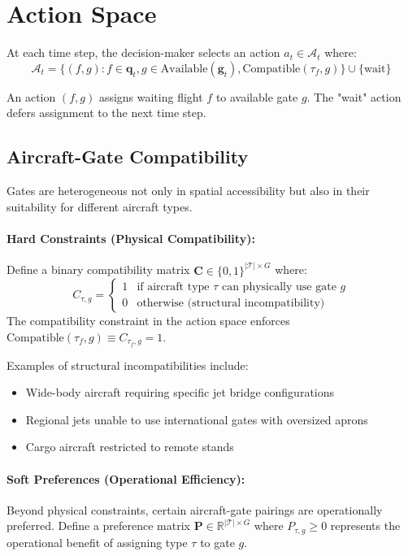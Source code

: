 \section{Action Space}

At each time step, the decision-maker selects an action $a_t \in \mathcal{A}_t$ where:
%
\begin{equation}
	\mathcal{A}_t = \{(f, g) : f \in \mathbf{q}_t, g \in \text{Available}(\mathbf{g}_t), 
	\text{Compatible}(\tau_f, g)\} \cup \{\text{wait}\}
\end{equation}

An action $(f, g)$ assigns waiting flight $f$ to available gate $g$. The "wait" action defers assignment to the next time step.
\subsection{Aircraft-Gate Compatibility}

Gates are heterogeneous not only in spatial accessibility but also in their 
suitability for different aircraft types.

\paragraph{Hard Constraints (Physical Compatibility):}
Define a binary compatibility matrix $\mathbf{C} \in \{0,1\}^{|\mathcal{T}| \times G}$ 
where:
%
\begin{equation}
	C_{\tau,g} = \begin{cases}
		1 & \text{if aircraft type } \tau \text{ can physically use gate } g \\
		0 & \text{otherwise (structural incompatibility)}
	\end{cases}
\end{equation}
%
The compatibility constraint in the action space enforces 
$\text{Compatible}(\tau_f, g) \equiv C_{\tau_f, g} = 1$.

Examples of structural incompatibilities include:
\begin{itemize}
	\item Wide-body aircraft requiring specific jet bridge configurations
	\item Regional jets unable to use international gates with oversized aprons
	\item Cargo aircraft restricted to remote stands
\end{itemize}

\paragraph{Soft Preferences (Operational Efficiency):}
Beyond physical constraints, certain aircraft-gate pairings are operationally 
preferred. Define a preference matrix $\mathbf{P} \in \mathbb{R}^{|\mathcal{T}| \times G}$ 
where $P_{\tau,g} \geq 0$ represents the operational benefit of assigning type 
$\tau$ to gate $g$.

